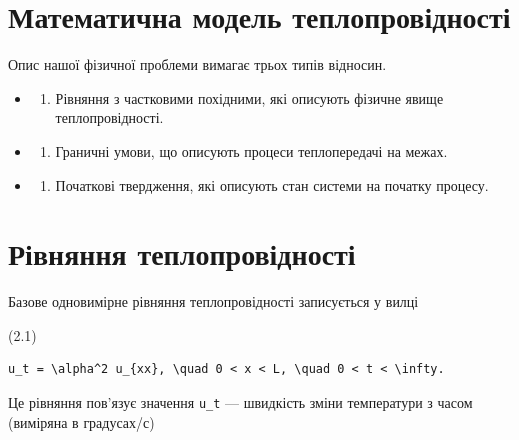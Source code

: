 \documentclass[
  ukrainian,
]{article}
\providecommand{\tightlist}{%
  \setlength{\itemsep}{0pt}\setlength{\parskip}{0pt}}
\begin{document}
\section{Математична модель
теплопровідності}\label{ux43cux430ux442ux435ux43cux430ux442ux438ux447ux43dux430-ux43cux43eux434ux435ux43bux44c-ux442ux435ux43fux43bux43eux43fux440ux43eux432ux456ux434ux43dux43eux441ux442ux456}

Опис нашої фізичної проблеми вимагає трьох типів відносин.

\begin{itemize}
\tightlist
\item
  \begin{enumerate}
  \def\labelenumi{\arabic{enumi}.}
  \tightlist
  \item
    Рівняння з частковими похідними, які описують фізичне явище
    теплопровідності.
  \end{enumerate}
\item
  \begin{enumerate}
  \def\labelenumi{\arabic{enumi}.}
  \setcounter{enumi}{1}
  \tightlist
  \item
    Граничні умови, що описують процеси теплопередачі на межах.
  \end{enumerate}
\item
  \begin{enumerate}
  \def\labelenumi{\arabic{enumi}.}
  \setcounter{enumi}{2}
  \tightlist
  \item
    Початкові твердження, які описують стан системи на початку процесу.
  \end{enumerate}
\end{itemize}

\section{Рівняння
теплопровідності}\label{ux440ux456ux432ux43dux44fux43dux43dux44f-ux442ux435ux43fux43bux43eux43fux440ux43eux432ux456ux434ux43dux43eux441ux442ux456}

Базове одновимірне рівняння теплопровідності записується у вилці

(2.1)

\begin{verbatim}
u_t = \alpha^2 u_{xx}, \quad 0 < x < L, \quad 0 < t < \infty.
\end{verbatim}

Це рівняння пов'язує значення \texttt{u\_t} --- швидкість зміни
температури з часом (виміряна в градусах/с)
\end{document}
